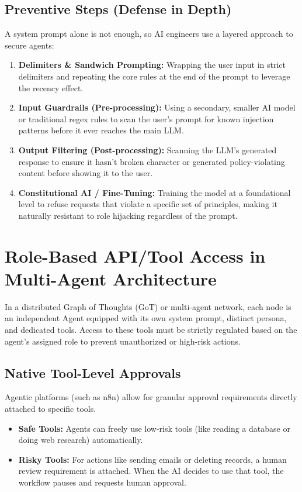 \documentclass[12pt,a4paper]{article}
\begin{document}
\subsection{Preventive Steps (Defense in Depth)}
A system prompt alone is not enough, so AI engineers use a layered approach to secure agents:
\begin{enumerate}
    \item \textbf{Delimiters \& Sandwich Prompting:} Wrapping the user input in strict delimiters and repeating the core rules at the end of the prompt to leverage the recency effect.
    \item \textbf{Input Guardrails (Pre-processing):} Using a secondary, smaller AI model or traditional regex rules to scan the user's prompt for known injection patterns before it ever reaches the main LLM.
    \item \textbf{Output Filtering (Post-processing):} Scanning the LLM's generated response to ensure it hasn't broken character or generated policy-violating content before showing it to the user.
    \item \textbf{Constitutional AI / Fine-Tuning:} Training the model at a foundational level to refuse requests that violate a specific set of principles, making it naturally resistant to role hijacking regardless of the prompt.
\end{enumerate}

\section{Role-Based API/Tool Access in Multi-Agent Architecture}
In a distributed Graph of Thoughts (GoT) or multi-agent network, each node is an independent Agent equipped with its own system prompt, distinct persona, and dedicated tools. Access to these tools must be strictly regulated based on the agent's assigned role to prevent unauthorized or high-risk actions.

\subsection{Native Tool-Level Approvals}
Agentic platforms (such as n8n) allow for granular approval requirements directly attached to specific tools. 
\begin{itemize}
    \item \textbf{Safe Tools:} Agents can freely use low-risk tools (like reading a database or doing web research) automatically.
    \item \textbf{Risky Tools:} For actions like sending emails or deleting records, a human review requirement is attached. When the AI decides to use that tool, the workflow pauses and requests human approval.
\end{itemize}
\end{document}
